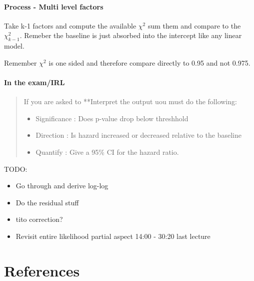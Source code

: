 \documentclass[
  letterpaper,
  DIV=11,
  numbers=noendperiod]{scrreprt}
\providecommand{\tightlist}{%
  \setlength{\itemsep}{0pt}\setlength{\parskip}{0pt}}\usepackage{longtable,booktabs,array}
\newlength{\cslhangindent}
\newlength{\cslentryspacingunit} %
\newenvironment{CSLReferences}[2] %
 {%
  \setlength{\parindent}{0pt}
  \ifodd #1
  \let\oldpar\par
  \def\par{\hangindent=\cslhangindent\oldpar}
  \fi
  \setlength{\parskip}{#2\cslentryspacingunit}
 }%
 {}
\begin{document}
\hypertarget{process---multi-level-factors}{%
\subsubsection{Process - Multi level
factors}\label{process---multi-level-factors}}

Take k-1 factors and compute the available \(\chi^2\) sum them and
compare to the \(\chi^2_{k-1}\). Remeber the baseline is just absorbed
into the intercept like any linear model.

Remember \(\chi^2\) is one sided and therefore compare directly to 0.95
and not 0.975.

\hypertarget{in-the-examirl}{%
\subsubsection{In the exam/IRL}\label{in-the-examirl}}

\begin{quote}
If you are asked to **Interpret the output uou must do the following:

\begin{itemize}
\tightlist
\item
  Significance : Does p-value drop below threshhold
\item
  Direction : Is hazard increased or decreased relative to the baseline
\item
  Quantify : Give a 95\% CI for the hazard ratio.
\end{itemize}
\end{quote}

TODO:

\begin{itemize}
\tightlist
\item
  Go through and derive log-log
\item
  Do the residual stuff
\item
  tito correction?
\item
  Revisit entire likelihood partial aspect 14:00 - 30:20 last lecture
\end{itemize}


\hypertarget{references}{%
\chapter*{References}\label{references}}


\hypertarget{refs}{}
\begin{CSLReferences}{0}{0}
\end{CSLReferences}
\end{document}
